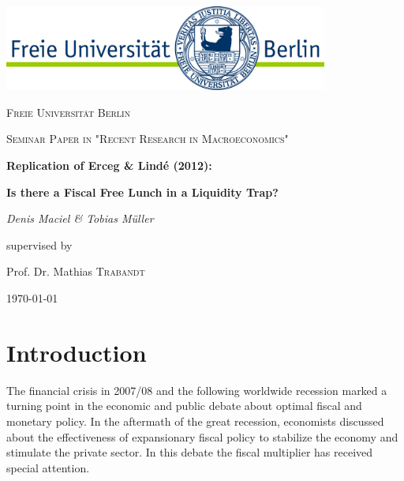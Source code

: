 \documentclass[12pt,a4paper,oneside,titlepage]{article}
\begin{document}
\parindent 0pt %
\begin{titlepage}
	\centering
	\includegraphics[width=0.8\textwidth]{pictures/LogoFU}\par\vspace{1cm}
	{\scshape\large Freie Universität Berlin \par}
	\vspace{1cm}
	{\scshape\large Seminar Paper in "Recent Research in Macroeconomics"\par}
	\vspace{1.5cm}
	{\LARGE\bfseries Replication of Erceg \& Lindé (2012):\par}
	\vspace{0.5cm}
	{\Large\bfseries Is there a Fiscal Free Lunch in a Liquidity Trap?\par}
	\vspace{2cm}
	{\Large\itshape Denis Maciel \& Tobias Müller\par}
	\vfill
	supervised by\par
	Prof. Dr. Mathias \textsc{Trabandt}

	\vfill

	{\large \today\par}
\end{titlepage}


\doublespacing
\tableofcontents

\pagebreak[4]
\listoffigures
\listoftables
\newpage

\section{Introduction}

The financial crisis in 2007/08 and the following worldwide recession marked a turning point in the economic and public debate about optimal fiscal and monetary policy. In the aftermath of the great recession, economists discussed about the effectiveness of expansionary fiscal policy to stabilize the economy and stimulate the private sector. In this debate the fiscal multiplier has received special attention.
\par
\bigskip
\end{document}

